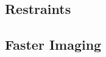 \documentclass[class=article, crop=false]{standalone}
\begin{document}
\subsection{Restraints}

\subsection{Faster Imaging}
\end{document}
